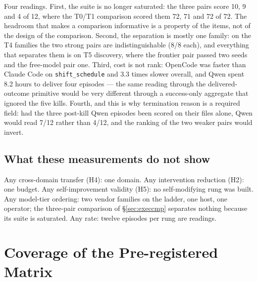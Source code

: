 \documentclass[11pt]{article}
\theoremstyle{definition}
\begin{document}
Four readings. First, the suite is no longer saturated: the three pairs score 10, 9 and 4 of 12, where the T0/T1 comparison scored them 72, 71 and 72 of 72. The headroom that makes a comparison informative is a property of the items, not of the design of the comparison. Second, the separation is mostly one family: on the T4 families the two strong pairs are indistinguishable (8/8 each), and everything that separates them is on T5 discovery, where the frontier pair passed two seeds and the free-model pair one. Third, cost is not rank: OpenCode was faster than Claude Code on \texttt{shift\_schedule} and 3.3 times slower overall, and Qwen spent 8.2 hours to deliver four episodes --- the same reading through the delivered-outcome primitive would be very different through a success-only aggregate that ignored the five kills. Fourth, and this is why termination reason is a required field: had the three post-kill Qwen episodes been scored on their files alone, Qwen would read 7/12 rather than 4/12, and the ranking of the two weaker pairs would invert.

\subsection{What these measurements do not show}

Any cross-domain transfer (H4): one domain. Any intervention reduction (H2): one budget. Any self-improvement validity (H5): no self-modifying rung was built. Any model-tier ordering: two vendor families on the ladder, one host, one operator; the three-pair comparison of \S\ref{sec:execcmp} separates nothing because its suite is saturated. Any rate: twelve episodes per rung are readings.

\section{Coverage of the Pre-registered Matrix}\label{sec:coverage}
\end{document}
